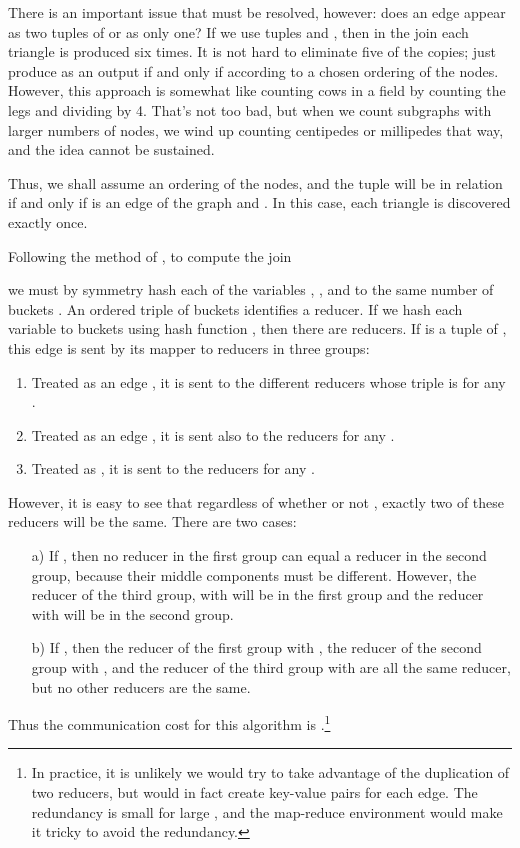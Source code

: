 There is an important issue that must be resolved, however: does an edge  appear as two tuples of  or as only one?  If we use tuples  and , then in the join each triangle is produced six times.  It is not hard to eliminate five of the copies; just produce  as an output if and only if  according to a chosen ordering of the nodes.  However, this approach is somewhat like counting cows in a field by counting the legs and dividing by 4.  That's not too bad, but when we count subgraphs with larger numbers of nodes, we wind up counting centipedes or millipedes that way, and the idea cannot be sustained.

Thus,  we shall assume an ordering  of the nodes, and the tuple  will be in relation  if and only if  is an edge of the graph and .  In this case, each triangle is discovered exactly once.

Following the method of \cite{AU10}, to compute the join

we must by symmetry hash each of the variables , , and  to the same number of buckets .  An ordered triple of buckets identifies a reducer.  If we hash each variable to  buckets using hash function , then there are  reducers.  If  is a tuple of , this edge is sent by its mapper to  reducers in three groups:

\begin{enumerate}

\item
Treated as an edge , it is sent to the  different reducers whose triple is  for any .

\item
Treated as an edge , it is sent also to the  reducers  for any .

\item
Treated as , it is sent to the reducers  for any .

\end{enumerate}
However, it is easy to see that regardless of whether or not , exactly two of these reducers will be the same.  There are two cases:

\begin{itemize}

\item[a)]
If , then no reducer in the first group can equal a reducer in the second group, because their middle components must be different.  However, the reducer of the third group, with  will be in the first group and the reducer with  will be in the second group.

\item[b)]
If , then the reducer of the first group with , the reducer of the second group with , and the reducer of the third group with  are all the same reducer, but no other reducers are the same.

\end{itemize}
Thus the communication cost for this algorithm is .\footnote{In practice, it is unlikely we would try to take advantage of the duplication of two reducers, but would in fact create  key-value pairs for each edge.  The redundancy is small for large , and the map-reduce environment would make it tricky to avoid the redundancy.}

